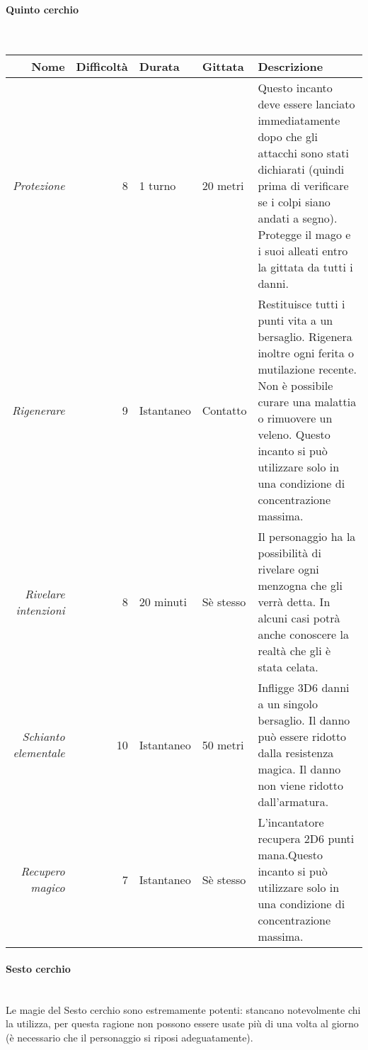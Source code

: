 \documentclass[../manuale_main.tex]{subfiles}
\begin{document}
\clearpage

\paragraph{Quinto cerchio}\mbox{}\\

\begin{tabularx}{\linewidth}{|N| D| T| G| Y|}
\hline
\textbf{Nome} & \textbf{Difficoltà} & \textbf{Durata} & \textbf{Gittata} & \textbf{Descrizione} \\ \hline\hline
\textit{Protezione} & 8 & 1 turno & 20 metri &Questo incanto deve essere lanciato immediatamente dopo che gli attacchi sono stati dichiarati (quindi prima di verificare se i colpi siano andati a segno). Protegge il mago e i suoi alleati entro la gittata da tutti i danni.  \\ \hline
\textit{Rigenerare} & 9 &Istantaneo  & Contatto  & Restituisce tutti i punti vita a un bersaglio. Rigenera inoltre ogni ferita o mutilazione recente. Non è possibile curare una malattia o rimuovere un veleno. Questo incanto si può utilizzare solo in una condizione di concentrazione massima.\\ \hline
\textit{Rivelare intenzioni} & 8 & 20 minuti & Sè stesso &Il personaggio ha la possibilità di rivelare ogni menzogna che gli verrà detta. In alcuni casi potrà anche conoscere la realtà che gli è stata celata.  \\ \hline
\textit{Schianto elementale} & 10  & Istantaneo & 50 metri &Infligge 3D6 danni a un singolo bersaglio. Il danno può essere ridotto dalla resistenza magica. Il danno non viene ridotto dall'armatura.\\ \hline
\textit{Recupero magico} & 7 & Istantaneo & Sè stesso & L'incantatore recupera 2D6 punti mana.Questo incanto si può utilizzare solo in una condizione di concentrazione massima.\\
\hline
\end{tabularx}

\clearpage

\paragraph{Sesto cerchio}\mbox{}\\

Le magie del Sesto cerchio sono estremamente potenti: stancano notevolmente chi la utilizza, per questa ragione non possono essere usate più di una volta al giorno (è necessario che il personaggio si riposi adeguatamente).
\end{document}

